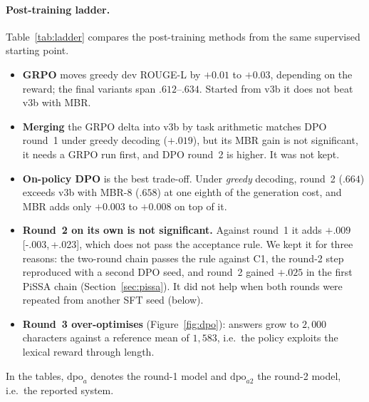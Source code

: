 \documentclass[11pt,a4paper]{article}
\newcommand{\rl}{ROUGE-L}
\newcommand{\ci}[2]{{\scriptsize[#1,\,#2]}}
\begin{document}
\paragraph{Post-training ladder.}
Table~\ref{tab:ladder} compares the post-training methods from the same supervised starting point.
\begin{itemize}[leftmargin=*]
\item \textbf{GRPO} moves greedy dev \rl{} by $+0.01$ to $+0.03$, depending on the reward; the final variants span $.612$--$.634$. Started from v3b it does not beat v3b with MBR.
\item \textbf{Merging} the GRPO delta into v3b by task arithmetic matches DPO round~1 under greedy decoding ($+.019$), but its MBR gain is not significant, it needs a GRPO run first, and DPO round~2 is higher. It was not kept.
\item \textbf{On-policy DPO} is the best trade-off. Under \emph{greedy} decoding, round~2 ($.664$) exceeds v3b with MBR-8 ($.658$) at one eighth of the generation cost, and MBR adds only $+0.003$ to $+0.008$ on top of it.
\item \textbf{Round~2 on its own is not significant.} Against round~1 it adds $+.009$ \ci{-.003}{+.023}, which does not pass the acceptance rule. We kept it for three reasons: the two-round chain passes the rule against C1, the round-2 step reproduced with a second DPO seed, and round~2 gained $+.025$ in the first PiSSA chain (Section~\ref{sec:pissa}). It did not help when both rounds were repeated from another SFT seed (below).
\item \textbf{Round~3 over-optimises} (Figure~\ref{fig:dpo}): answers grow to $2{,}000$ characters against a reference mean of $1{,}583$, i.e.\ the policy exploits the lexical reward through length.
\end{itemize}
In the tables, $\mathrm{dpo}_a$ denotes the round-1 model and $\mathrm{dpo}_{a2}$ the round-2 model, i.e.\ the reported system.
\end{document}

